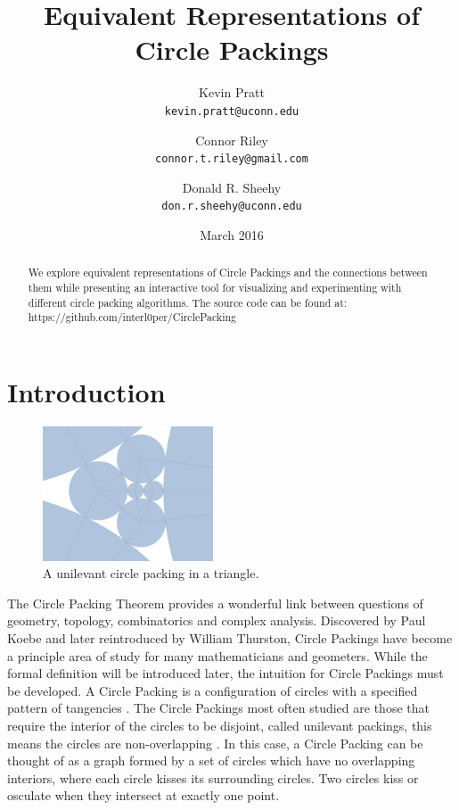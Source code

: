 \documentclass[11pt]{article}
\title{Equivalent Representations of Circle Packings}
\author{
  Kevin Pratt\\
  \texttt{kevin.pratt@uconn.edu}
  \and
  Connor Riley\\
  \texttt{connor.t.riley@gmail.com}
    \and
  Donald R. Sheehy\\
  \texttt{don.r.sheehy@uconn.edu}
}\date{March 2016}
\begin{document}
\maketitle

\begin{abstract}
  We explore equivalent representations of Circle Packings and the connections between them while presenting an interactive tool for visualizing and experimenting with different circle packing algorithms. 
  The source code can be found at: https://github.com/interl0per/CirclePacking
\end{abstract}

\section{Introduction}

\begin{figure}
  \begin{center}
    \includegraphics[scale=.18,width=0.45\textwidth]{circlepacking_1}
  \end{center}
  \caption{A unilevant circle packing in a triangle.}
\end{figure}

The Circle Packing Theorem provides a wonderful link between questions of geometry, topology, combinatorics and complex analysis. Discovered by Paul Koebe and later reintroduced by William Thurston, Circle Packings have become a principle area of study for many mathematicians and geometers. While the formal definition will be introduced later, the intuition for Circle Packings must be developed. A Circle Packing is a configuration of circles with a specified pattern of tangencies \cite{stephenson05introduction}. The Circle Packings most often studied are those that require the interior of the circles to be disjoint, called unilevant packings, this means the circles are non-overlapping \cite{stephenson05introduction}. In this case, a Circle Packing can be thought of as a graph formed by a set of circles which have no overlapping interiors, where each circle kisses its surrounding circles. Two circles kiss or osculate when they intersect at exactly one point. 
\end{document}
